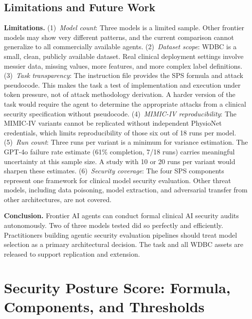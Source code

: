 \documentclass[11pt]{article}
\begin{document}
\subsection{Limitations and Future Work}

\textbf{Limitations.}
(1)~\emph{Model count}: Three models is a limited sample. Other frontier
models may show very different patterns, and the current comparison cannot
generalize to all commercially available agents.
(2)~\emph{Dataset scope}: WDBC is a small, clean, publicly available dataset.
Real clinical deployment settings involve messier data, missing values, more
features, and more complex label definitions.
(3)~\emph{Task transparency}: The instruction file provides the SPS formula
and attack pseudocode. This makes the task a test of implementation and
execution under token pressure, not of attack methodology derivation. A harder
version of the task would require the agent to determine the appropriate
attacks from a clinical security specification without pseudocode.
(4)~\emph{MIMIC-IV reproducibility}: The MIMIC-IV variants cannot be
replicated without independent PhysioNet credentials, which limits
reproducibility of those six out of 18 runs per model.
(5)~\emph{Run count}: Three runs per variant is a minimum for variance
estimation. The GPT-4o failure rate estimate (61\% completion, 7/18 runs)
carries meaningful uncertainty at this sample size. A study with 10 or 20
runs per variant would sharpen these estimates.
(6)~\emph{Security coverage}: The four SPS components represent one
framework for clinical model security evaluation. Other threat models,
including data poisoning, model extraction, and adversarial transfer from
other architectures, are not covered.

\textbf{Conclusion.}
Frontier AI agents can conduct formal clinical AI security audits
autonomously. Two of three models tested did so perfectly and efficiently.
Practitioners building agentic security evaluation pipelines should treat
model selection as a primary architectural decision. The task and all WDBC
assets are released to support replication and extension.




\appendix

\section{Security Posture Score: Formula, Components, and Thresholds}
\label{app:sps}
\end{document}
